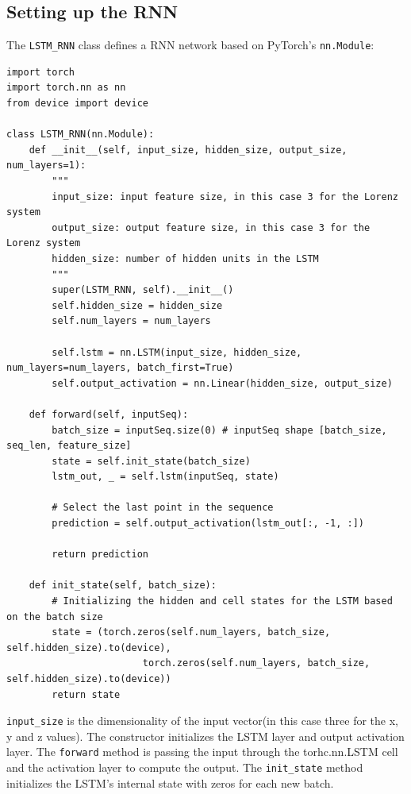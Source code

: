 \documentclass[11pt]{article}
\begin{document}
\subsection{Setting up the RNN}

The \texttt{LSTM\_RNN} class defines a RNN network based on PyTorch's \texttt{nn.Module}:

\begin{lstlisting}
import torch
import torch.nn as nn
from device import device

class LSTM_RNN(nn.Module):
    def __init__(self, input_size, hidden_size, output_size, num_layers=1):
        """
        input_size: input feature size, in this case 3 for the Lorenz system
        output_size: output feature size, in this case 3 for the Lorenz system
        hidden_size: number of hidden units in the LSTM
        """
        super(LSTM_RNN, self).__init__()
        self.hidden_size = hidden_size
        self.num_layers = num_layers

        self.lstm = nn.LSTM(input_size, hidden_size, num_layers=num_layers, batch_first=True)
        self.output_activation = nn.Linear(hidden_size, output_size)
    
    def forward(self, inputSeq):
        batch_size = inputSeq.size(0) # inputSeq shape [batch_size, seq_len, feature_size]
        state = self.init_state(batch_size)
        lstm_out, _ = self.lstm(inputSeq, state)

        # Select the last point in the sequence
        prediction = self.output_activation(lstm_out[:, -1, :])

        return prediction

    def init_state(self, batch_size):
        # Initializing the hidden and cell states for the LSTM based on the batch size
        state = (torch.zeros(self.num_layers, batch_size, self.hidden_size).to(device),
                        torch.zeros(self.num_layers, batch_size, self.hidden_size).to(device))
        return state
\end{lstlisting}

\texttt{input\_size} is the dimensionality of the input vector(in this case three for the x, y and z values). The constructor initializes the LSTM layer and output activation layer. The \texttt{forward} method is passing the input through the torhc.nn.LSTM cell and the activation layer to compute the output. The \texttt{init\_state} method initializes the LSTM's internal state with zeros for each new batch. \\
\end{document}
